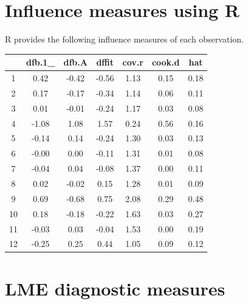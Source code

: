 \documentclass[12pt, a4paper]{report}
\theoremstyle{plain}
\theoremstyle{definition}
\theoremstyle{remark}
\begin{document}
	
	\section{Influence measures using R}
	R provides the following influence measures of each observation.
	
	
	\begin{table}[ht]
		\begin{center}
			\begin{tabular}{|c|c|c|c|c|c|c|}
				\hline
				& dfb.1\_ & dfb.A & dffit & cov.r & cook.d & hat \\
				\hline
				1 & 0.42 & -0.42 & -0.56 & 1.13 & 0.15 & 0.18 \\
				2 & 0.17 & -0.17 & -0.34 & 1.14 & 0.06 & 0.11 \\
				3 & 0.01 & -0.01 & -0.24 & 1.17 & 0.03 & 0.08 \\
				4 & -1.08 & 1.08 & 1.57 & 0.24 & 0.56 & 0.16 \\
				5 & -0.14 & 0.14 & -0.24 & 1.30 & 0.03 & 0.13 \\
				6 & -0.00 & 0.00 & -0.11 & 1.31 & 0.01 & 0.08 \\
				7 & -0.04 & 0.04 & -0.08 & 1.37 & 0.00 & 0.11 \\
				8 & 0.02 & -0.02 & 0.15 & 1.28 & 0.01 & 0.09 \\
				9 & 0.69 & -0.68 & 0.75 & 2.08 & 0.29 & 0.48 \\
				10 & 0.18 & -0.18 & -0.22 & 1.63 & 0.03 & 0.27 \\
				11 & -0.03 & 0.03 & -0.04 & 1.53 & 0.00 & 0.19 \\
				12 & -0.25 & 0.25 & 0.44 & 1.05 & 0.09 & 0.12 \\
				\hline
			\end{tabular}
		\end{center}
	\end{table}
	
	
	
	
	
	
	
	\section{LME diagnostic measures}
\end{document}
